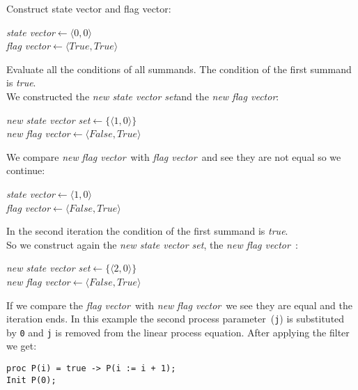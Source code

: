 \documentclass[a4paper,10pt]{article}
\theoremstyle{plain}
\theoremstyle{definition}
\newcommand{\lpe}{linear process equation}
\newcommand{\pp}{process parameter}
\newcommand{\ti}{\textit}
\newcommand{\sv}{\textit{state vector}}
\newcommand{\fv}{\textit{flag vector}}
\newcommand{\svs}{\textit{new state vector set}}
\newcommand{\nfv}{\textit{new flag vector}}
\newcommand{\la}{$\leftarrow$}
\begin{document}
Construct state vector and flag vector: 
\begin{center}\begin{minipage}{250pt}
\sv \la  $\langle 0 , 0 \rangle$\\
\fv \la  $\langle True , True \rangle$\\
\end{minipage}\end{center}

Evaluate all the conditions of all summands.
The condition of the first summand is \ti{true}.\\

We constructed the \svs and the \nfv :
\begin{center}\begin{minipage}{250pt}
\svs \la  $\lbrace \langle 1 , 0 \rangle \rbrace $\\
\nfv \la $\langle False , True \rangle $
\end{minipage}\end{center}

We compare \ti{new} \fv\ with \fv\ and see they are not equal so we continue:
\begin{center}\begin{minipage}{250pt}
\sv \la $\langle 1 , 0 \rangle $\\
\fv \la $\langle False , True \rangle $\\
\end{minipage}\end{center}

In the second iteration the condition of the first summand is \ti{true}.\\
So we construct again the \svs, the \nfv\ : 
\begin{center}\begin{minipage}{250pt}
\svs \la  $\lbrace \langle 2 , 0 \rangle \rbrace $\\
\nfv \la  $\langle False , True \rangle $ \\
\end{minipage}\end{center}

If we compare the \fv\ with \ti{new} \fv\ we see they are equal and the iteration ends.
In this example the second \pp\ (\verb"j") is substituted by \verb"0" and \verb"j" is removed from the \lpe.
After applying the filter we get:\\
\begin{verbatim}
proc P(i) = true -> P(i := i + 1);
Init P(0);
\end{verbatim}
\end{document}
